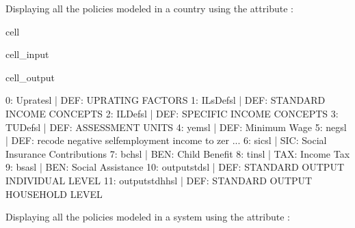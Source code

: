 \documentclass[letterpaper,10pt,english]{sphinxmanual}
\begin{document}
\sphinxAtStartPar
Displaying all the policies modeled in a country using the attribute :

\begin{sphinxuseclass}{cell}
\begin{sphinxuseclass}{cell_input}
\begin{sphinxVerbatim}[commandchars=\\\{\}]
\PYG{p}{[}\PYG{p}{]}
\end{sphinxVerbatim}

\end{sphinxuseclass}
\begin{sphinxuseclass}{cell_output}
\begin{sphinxVerbatim}[commandchars=\\\{\}]
0: Uprate\PYGZus{}sl            |    DEF: UPRATING FACTORS 
1: ILsDef\PYGZus{}sl            |    DEF: STANDARD INCOME CONCEPTS 
2: ILDef\PYGZus{}sl             |    DEF: SPECIFIC INCOME CONCEPTS 
3: TUDef\PYGZus{}sl             |    DEF: ASSESSMENT UNITS 
4: yem\PYGZus{}sl               |    DEF: Minimum Wage 
5: neg\PYGZus{}sl               |    DEF: recode negative self\PYGZhy{}employment income to zer ... 
6: sic\PYGZus{}sl               |    SIC: Social Insurance Contributions 
7: bch\PYGZus{}sl               |    BEN: Child Benefit 
8: tin\PYGZus{}sl               |    TAX: Income Tax 
9: bsa\PYGZus{}sl               |    BEN: Social Assistance 
10: output\PYGZus{}std\PYGZus{}sl       |    DEF: STANDARD OUTPUT INDIVIDUAL LEVEL 
11: output\PYGZus{}std\PYGZus{}hh\PYGZus{}sl    |    DEF: STANDARD OUTPUT HOUSEHOLD LEVEL 
\end{sphinxVerbatim}

\end{sphinxuseclass}
\end{sphinxuseclass}
\sphinxAtStartPar
Displaying all the policies modeled in a system using the attribute :
\end{document}

